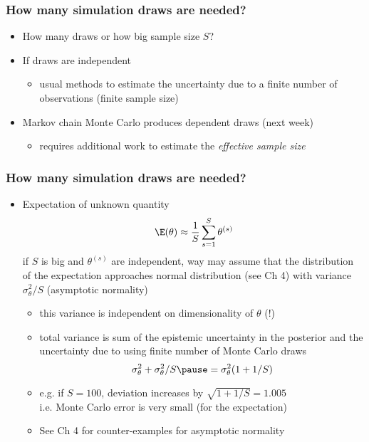 \documentclass[10pt]{beamer}
\begin{document}
\begin{frame}


\frametitle{How many simulation draws are needed?}

  \begin{itemize}
  \item How many draws or how big sample size $S$?
  \item If draws are independent
    \begin{itemize}
    \item usual methods to estimate the uncertainty due to a finite
      number of observations (finite sample size)
    \end{itemize}
  \item Markov chain Monte Carlo produces dependent draws (next week)
    \begin{itemize}
    \item requires additional work to estimate the \emph{effective
        sample size}
    \end{itemize}
  \end{itemize}

\end{frame}

\begin{frame}

\frametitle{How many simulation draws are needed?}

  \begin{itemize}
  \item Expectation of unknown quantity
    \begin{equation*}
      \E(\theta)\approx \frac{1}{S}\sum_{s=1}^S \theta^{(s)}
    \end{equation*}
    if $S$ is big and $\theta^{(s)}$ are independent, way may assume
    that the distribution of the expectation approaches normal
    distribution (see Ch 4) with variance $\sigma^2_\theta/S$
    (asymptotic normality)
    \begin{itemize}
    \item this variance is independent on dimensionality of $\theta$ (!)
      \pause
    \item total variance is sum of the epistemic uncertainty in the
      posterior and the uncertainty due to using finite number of
      Monte Carlo draws
      \begin{equation*}
        \sigma^2_\theta+\sigma^2_\theta/S \pause= \sigma^2_\theta(1+1/S)
      \end{equation*}
      \pause
      \vspace{-5mm}
    \item e.g. if $S=100$, deviation increases by $\sqrt{1+1/S}=1.005$\\
      i.e. Monte Carlo error is very small (for the expectation)
      \pause
    \item See Ch 4 for counter-examples for asymptotic normality
    \end{itemize}
\end{itemize}

\end{frame}
\end{document}

